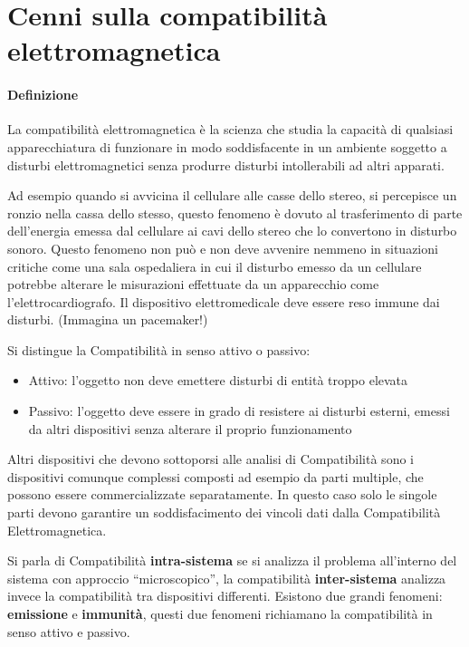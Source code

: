 \section{Cenni sulla compatibilità elettromagnetica}
\paragraph{Definizione}
La compatibilità elettromagnetica è la scienza che studia la capacità di qualsiasi 
apparecchiatura di funzionare in modo soddisfacente in un ambiente soggetto a disturbi elettromagnetici
senza produrre disturbi intollerabili ad altri apparati.

Ad esempio quando si avvicina il cellulare alle casse dello stereo, si percepisce un ronzio nella cassa
dello stesso, questo fenomeno è dovuto al trasferimento di parte dell'energia emessa dal cellulare ai cavi 
dello stereo che lo convertono in disturbo sonoro.
Questo fenomeno non può e non deve avvenire nemmeno in situazioni critiche come una sala ospedaliera in cui il disturbo
emesso da un cellulare potrebbe alterare le misurazioni effettuate da un apparecchio come l'elettrocardiografo.
Il dispositivo elettromedicale deve essere reso immune dai disturbi. (Immagina un pacemaker!)

Si distingue la Compatibilità in senso attivo o passivo:
\begin{itemize}
 \item Attivo: l'oggetto non deve emettere disturbi di entità troppo elevata
 \item Passivo: l'oggetto deve essere in grado di resistere ai disturbi esterni, emessi da altri dispositivi
 senza alterare il proprio funzionamento
\end{itemize}

Altri dispositivi che devono sottoporsi alle analisi di Compatibilità sono i dispositivi comunque complessi
composti ad esempio da parti multiple, che possono essere commercializzate separatamente. In questo caso solo
le singole parti devono garantire un soddisfacimento dei vincoli dati dalla Compatibilità Elettromagnetica.

Si parla di Compatibilità \textbf{intra-sistema} se si analizza il problema all'interno del sistema con approccio
``microscopico'', la compatibilità \textbf{inter-sistema} analizza invece la compatibilità tra dispositivi differenti.
Esistono due grandi fenomeni: \textbf{emissione} e \textbf{immunità}, questi due fenomeni richiamano la compatibilità in senso attivo e passivo.
\medskip

